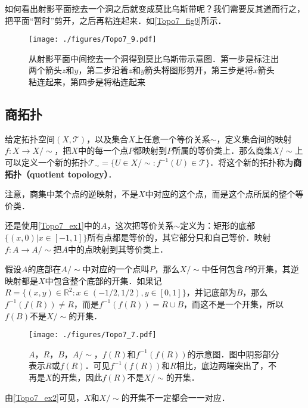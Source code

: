 如何看出射影平面挖去一个洞之后就变成莫比乌斯带呢？我们需要反其道而行之，把平面“暂时”剪开，之后再粘连起来．如\autoref{Topo7_fig9}所示．

\begin{figure}[ht]
\centering
\texttt{[image: ./figures/Topo7\_9.pdf]}
\caption{从射影平面中间挖去一个洞得到莫比乌斯带示意图．第一步是标注出两个箭头$z$和$y$，第二步沿着$z$和$y$箭头将图形剪开，第三步是将$x$箭头粘连起来，第四步是将粘连起来} \label{Topo7_fig9}
\end{figure}

\subsection{商拓扑}

给定拓扑空间$(X, \mathcal{T})$，以及集合$X$上任意一个等价关系$\sim$，定义集合间的映射$f:X\rightarrow X/\sim$，把$X$中的每一个点$P$都映射到$P$所属的等价类上．那么商集$X/\sim$上可以定义一个新的拓扑$\mathcal{T}_\sim=\{U\in X/\sim: f^{-1}(U)\in\mathcal{T}\}$．将这个新的拓扑称为\textbf{商拓扑（quotient topology）}．

注意，商集中某个点的逆映射，不是$X$中对应的这个点，而是这个点所属的整个等价类．

\begin{example}{}\label{Topo7_ex2}

还是使用\autoref{Topo7_ex1}中的$A$，这次把等价关系$\sim$定义为：矩形的底部$\{(x,0)|x\in[-1,1]\}$所有点都是等价的，其它部分只和自己等价．映射$f:A\rightarrow A/\sim$把$A$中的点映射到其等价类上．

假设$A$的底部在$A/\sim$中对应的一个点叫$P$，那么$X/\sim$中任何包含$P$的开集，其逆映射都是$X$中包含整个底部的开集．如果记$R=\{(x,y)\in\mathbb{R}^2:x\in(-1/2,1/2),y\in[0,1]\}$，并记底部为$B$，那么$f^{-1}(f(R))\not=R$，而是$f^{-1}(f(R))=R\cup B$，而这不是一个开集，所以$f(B)$不是$X/\sim$的开集．


\begin{figure}[ht]
\centering
\texttt{[image: ./figures/Topo7\_7.pdf]}
\caption{$A$，$R$，$B$，$A/\sim$，$f(R)$和$f^{-1}(f(R))$的示意图．图中阴影部分表示$R$或$f(R)$．可见$f^{-1}(f(R))$和$R$相比，底边两端突出了，不再是$X$的开集，因此$f(R)$不是$X/\sim$的开集．} \label{Topo7_fig7}
\end{figure}

\end{example}

由\autoref{Topo7_ex2}可见，$X$和$X/\sim$的开集不一定都会一一对应．

